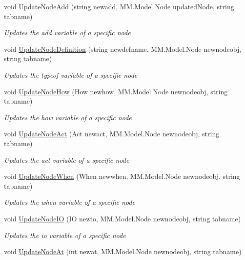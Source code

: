 \begin{DoxyCompactItemize}
void \hyperlink{class_model_controller_a0e667937f2c81e87b6fa8a501aea09b9}{Update\+Node\+Add} (string newadd, M\+M.\+Model.\+Node updated\+Node, string tabname)
\begin{DoxyCompactList}\small\item\em Updates the add variable of a specific node \end{DoxyCompactList}\item 
void \hyperlink{class_model_controller_a98a3ea019f3d366a0f91d3536f96a1c3}{Update\+Node\+Definition} (string newdefname, M\+M.\+Model.\+Node newnodeobj, string tabname)
\begin{DoxyCompactList}\small\item\em Updates the typeof variable of a specific node \end{DoxyCompactList}\item 
void \hyperlink{class_model_controller_ae9cfb758e08532565a361a02cdad420f}{Update\+Node\+How} (How newhow, M\+M.\+Model.\+Node newnodeobj, string tabname)
\begin{DoxyCompactList}\small\item\em Updates the how variable of a specific node \end{DoxyCompactList}\item 
void \hyperlink{class_model_controller_add94ec175f5f81a3acb57a33f958c3a5}{Update\+Node\+Act} (Act newact, M\+M.\+Model.\+Node newnodeobj, string tabname)
\begin{DoxyCompactList}\small\item\em Updates the act variable of a specific node \end{DoxyCompactList}\item 
void \hyperlink{class_model_controller_a008c60f8bb31f6525f116b7b9cd7107b}{Update\+Node\+When} (When newwhen, M\+M.\+Model.\+Node newnodeobj, string tabname)
\begin{DoxyCompactList}\small\item\em Updates the when variable of a specific node \end{DoxyCompactList}\item 
void \hyperlink{class_model_controller_aefda67a5dfdc0b8dd5dfc8811d42a52a}{Update\+Node\+IO} (IO newio, M\+M.\+Model.\+Node newnodeobj, string tabname)
\begin{DoxyCompactList}\small\item\em Updates the io variable of a specific node \end{DoxyCompactList}\item 
void \hyperlink{class_model_controller_acd6773a9b3bd6bacec227104838d5403}{Update\+Node\+At} (int newat, M\+M.\+Model.\+Node newnodeobj, string tabname)

\end{DoxyCompactItemize}
